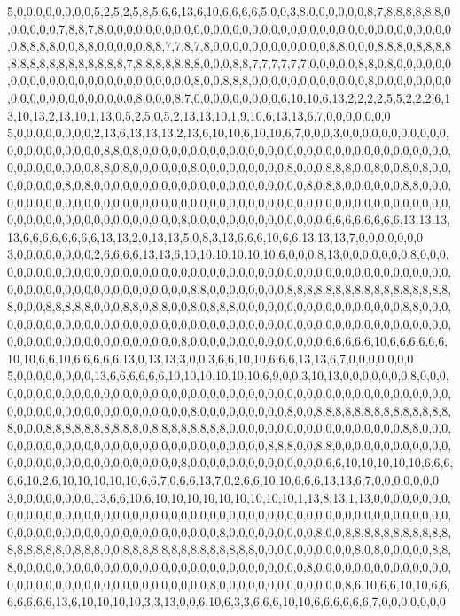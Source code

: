 5,0,0,0,0,0,0,0,0,5,2,5,2,5,8,5,6,6,13,6,10,6,6,6,6,5,0,0,3,8,0,0,0,0,0,0,8,7,8,8,8,8,8,8,0,0,0,0,0,0,7,8,8,7,8,0,0,0,0,0,0,0,0,0,0,0,0,0,0,0,0,0,0,0,0,0,0,0,0,0,0,0,0,0,0,0,0,0,0,0,0,0,8,8,8,8,0,0,8,8,0,0,0,0,0,8,8,7,7,8,7,8,0,0,0,0,0,0,0,0,0,0,0,0,8,8,0,0,0,8,8,8,0,8,8,8,8,8,8,8,8,8,8,8,8,8,8,8,8,7,8,8,8,8,8,8,8,0,0,0,8,8,7,7,7,7,7,7,0,0,0,0,0,8,8,0,8,0,0,0,0,0,0,0,0,0,0,0,0,0,0,0,0,0,0,0,0,0,0,0,0,0,8,0,0,8,8,8,0,0,0,0,0,0,0,0,0,0,0,0,8,0,0,0,0,0,0,0,0,0,0,0,0,0,0,0,0,0,0,0,0,0,8,0,0,0,8,7,0,0,0,0,0,0,0,0,0,6,10,10,6,13,2,2,2,2,5,5,2,2,2,6,13,10,13,2,13,10,1,13,0,5,2,5,0,5,2,13,13,10,1,9,10,6,13,13,6,7,0,0,0,0,0,0,0
5,0,0,0,0,0,0,0,0,2,13,6,13,13,13,2,13,6,10,10,6,10,10,6,7,0,0,0,3,0,0,0,0,0,0,0,0,0,0,0,0,0,0,0,0,0,0,0,0,0,8,8,0,8,0,0,0,0,0,0,0,0,0,0,0,0,0,0,0,0,0,0,0,0,0,0,0,0,0,0,0,0,0,0,0,0,0,0,0,0,0,0,0,0,0,8,8,0,8,0,0,0,0,0,0,8,0,0,0,0,0,0,0,0,0,8,0,0,0,8,8,8,0,0,8,0,0,8,0,8,0,0,0,0,0,0,0,0,8,0,8,0,0,0,0,0,0,0,0,0,0,0,0,0,0,0,0,0,0,0,0,0,0,8,0,8,8,0,0,0,0,0,0,8,8,0,0,0,0,0,0,0,0,0,0,0,0,0,0,0,0,0,0,0,0,0,0,0,0,0,0,0,0,0,0,0,0,0,0,0,0,0,0,0,0,0,0,0,0,0,0,0,0,0,0,0,0,0,0,0,0,0,0,0,0,0,0,0,0,0,0,0,8,0,0,0,0,0,0,0,0,0,0,0,0,0,0,6,6,6,6,6,6,6,6,13,13,13,13,6,6,6,6,6,6,6,6,13,13,2,0,13,13,5,0,8,3,13,6,6,6,10,6,6,13,13,13,7,0,0,0,0,0,0,0
3,0,0,0,0,0,0,0,0,2,6,6,6,6,13,13,6,10,10,10,10,10,10,6,0,0,0,8,13,0,0,0,0,0,0,0,8,0,0,0,0,0,0,0,0,0,0,0,0,0,0,0,0,0,0,0,0,0,0,0,0,0,0,0,0,0,0,0,0,0,0,0,0,0,0,0,0,0,0,0,0,0,0,0,0,0,0,0,0,0,0,0,0,0,0,0,0,0,0,0,0,0,0,0,0,8,8,0,0,0,0,0,0,0,0,8,8,8,8,8,8,8,8,8,8,8,8,8,8,8,8,8,8,0,0,0,8,8,8,8,8,0,0,0,8,8,0,8,8,0,0,8,0,8,8,8,0,0,0,0,0,0,0,0,0,0,0,0,0,0,0,0,0,8,8,0,0,0,0,0,0,0,0,0,0,0,0,0,0,0,0,0,0,0,0,0,0,0,0,0,0,0,0,0,0,0,0,0,0,0,0,0,0,0,0,0,0,0,0,0,0,0,0,0,0,0,0,0,0,0,0,0,0,0,0,0,0,0,0,0,0,0,8,0,0,0,0,0,0,0,0,0,0,0,0,0,0,6,6,6,6,6,10,6,6,6,6,6,6,10,10,6,6,10,6,6,6,6,6,13,0,13,13,3,0,0,3,6,6,10,10,6,6,6,13,13,6,7,0,0,0,0,0,0,0
5,0,0,0,0,0,0,0,0,13,6,6,6,6,6,6,10,10,10,10,10,10,6,9,0,0,3,10,13,0,0,0,0,0,0,0,8,0,0,0,0,0,0,0,0,0,0,0,0,0,0,0,0,0,0,0,0,0,0,0,0,0,0,0,0,0,0,0,0,0,0,0,0,0,0,0,0,0,0,0,0,0,0,0,0,0,0,0,0,0,0,0,0,0,0,0,0,0,0,0,0,0,0,0,0,8,0,0,0,0,0,0,0,0,0,8,0,0,8,8,8,8,8,8,8,8,8,8,8,8,8,8,8,0,0,0,8,8,8,8,8,8,8,8,8,8,0,8,8,8,8,8,8,8,8,0,0,0,0,0,0,0,0,0,0,0,0,0,0,0,0,0,0,8,8,0,0,0,0,0,0,0,0,0,0,0,0,0,0,0,0,0,0,0,0,0,0,0,0,0,0,0,0,0,0,8,8,8,0,0,8,8,0,0,0,0,0,0,0,0,0,0,0,0,0,0,0,0,0,0,0,0,0,0,0,0,0,0,0,0,0,0,8,0,0,0,0,0,0,0,0,0,0,0,0,0,0,6,6,10,10,10,10,10,6,6,6,6,6,10,2,6,10,10,10,10,10,6,6,7,0,6,6,13,7,0,2,6,6,10,10,6,6,6,13,13,6,7,0,0,0,0,0,0,0
3,0,0,0,0,0,0,0,0,13,6,6,10,6,10,10,10,10,10,10,10,10,10,1,13,8,13,1,13,0,0,0,0,0,0,0,0,0,0,0,0,0,0,0,0,0,0,0,0,0,0,0,0,0,0,0,0,0,0,0,0,0,0,0,0,0,0,0,0,0,0,0,0,0,0,0,0,0,0,0,0,0,0,0,0,0,0,0,0,0,0,0,0,0,0,0,0,0,0,0,0,0,0,0,0,8,0,0,0,0,0,0,0,0,0,8,0,0,8,8,8,8,8,8,8,8,8,8,8,8,8,8,8,8,8,0,8,8,8,0,0,8,8,8,8,8,8,8,8,8,8,8,8,8,8,0,0,0,0,0,0,0,0,0,0,8,0,8,0,0,0,0,0,8,8,8,0,0,0,0,0,0,0,0,0,0,0,0,0,0,0,0,0,0,0,0,0,0,0,0,0,0,0,0,0,0,8,0,0,0,0,0,0,0,0,0,0,0,0,0,0,0,0,0,0,0,0,0,0,0,0,0,0,0,0,0,0,0,0,0,0,0,8,0,0,0,0,0,0,0,0,0,0,0,0,0,8,6,10,6,6,10,10,6,6,6,6,6,6,6,13,6,10,10,10,10,3,3,13,0,0,6,10,6,3,3,6,6,6,10,10,6,6,6,6,6,6,7,0,0,0,0,0,0,0
